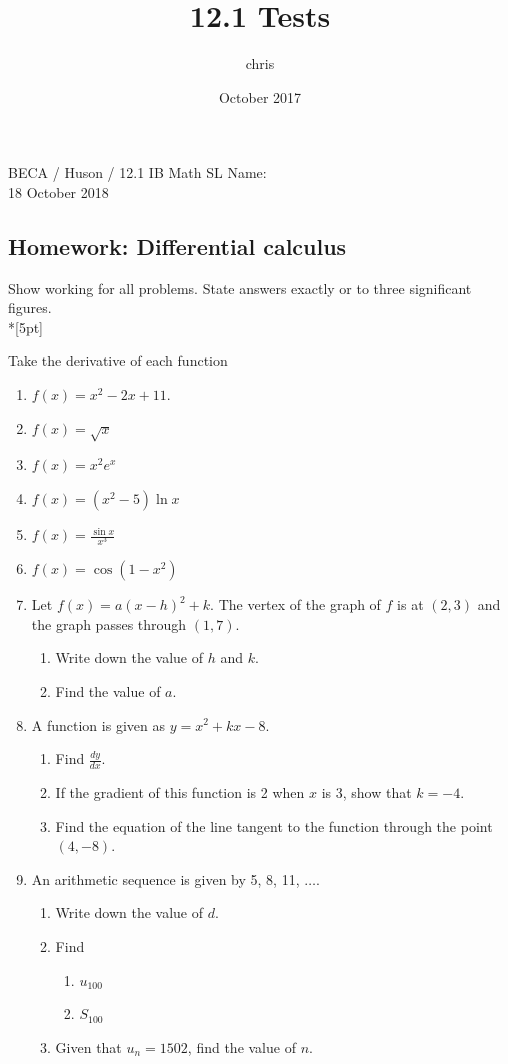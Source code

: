 \documentclass{article}
\title{12.1 Tests}
\author{chris }
\date{October 2017}
\begin{document}
\noindent BECA / Huson / 12.1 IB Math SL \qquad \qquad Name:\\
18 October 2018
\subsection*{Homework: Differential calculus}
Show working for all problems. State answers exactly or to three significant figures.\\*[5pt]

Take the derivative of each function

\begin{enumerate}

\item $f(x) = x^2 - 2x + 11$.
\item $f(x)=\sqrt{x}$
\item $f(x)=x^2 e^x$
\item $f(x)=(x^2-5)\ln{x}$
\item $\displaystyle f(x)=\frac{\sin{x}}{x^3}$
\item $f(x)=\cos{(1-x^2)}$

\item Let $f(x)=a(x-h)^2+k$. The vertex of the graph of $f$ is at $(2,3)$ and the graph passes through $(1,7)$.
\begin{enumerate}
    \item Write down the value of $h$ and $k$.
    \item Find the value of $a$.
\end{enumerate}

\item A function is given as $y = x^2 + kx -8$.
\begin{enumerate}
    \item Find $\displaystyle \frac {dy}{dx}$.
	\item If the gradient of this function is 2 when $x$ is 3, show that $k=-4$.
	\item Find the equation of the line tangent to the function through the point $(4, -8)$.
\end{enumerate}

\item An arithmetic sequence is given by 5, 8, 11, $\ldots$.
\begin{enumerate}
    \item Write down the value of $d$.
	\item Find
	\begin{enumerate}
	    \item $u_{100}$
	    \item $S_{100}$
	\end{enumerate}
	\item Given that $u_n = 1502$, find the value of $n$.
\end{enumerate}


\end{enumerate}
\end{document}
